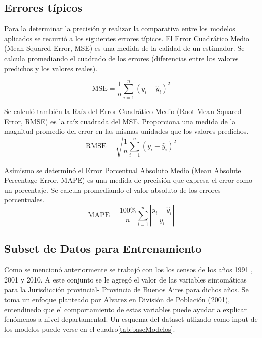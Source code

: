 \documentclass{article}
\theoremstyle{mytheoremstyle}
\theoremstyle{mytheoremstyle}
\theoremstyle{myproblemstyle}
\begin{document}
\subsection{Errores típicos}
 Para la determinar la precisión y realizar la comparativa entre los modelos aplicados se recurrió a los siguientes errores típicos.\newline
El Error Cuadrático Medio (Mean Squared Error, MSE) es una medida de la calidad de un estimador.
Se calcula promediando el cuadrado de los errores (diferencias entre los valores predichos y los valores reales).\newline

  \[
    \text{MSE} = \frac{1}{n} \sum_{i=1}^{n} (y_i - \hat{y}_i)^2
  \]


 Se calculó también la Raíz del Error Cuadrático Medio (Root Mean Squared Error, RMSE) es la raíz cuadrada del MSE. 
Proporciona una medida de la magnitud promedio del error en las mismas unidades que los valores predichos.\newline   
\[
\text{RMSE} = \sqrt{\frac{1}{n} \sum_{i=1}^{n} (y_i - \hat{y}_i)^2}
\]
 
Asimismo se determinó el Error Porcentual Absoluto Medio (Mean Absolute Percentage Error, MAPE) es 
una medida de precisión que expresa el error como un porcentaje. 
Se calcula promediando el valor absoluto de los errores porcentuales.
\[
\text{MAPE} = \frac{100\%}{n} \sum_{i=1}^{n} \left| \frac{y_i - \hat{y}_i}{y_i} \right|
\]

\subsection{Subset de Datos para Entrenamiento}
 Como se mencionó anteriormente se trabajó con los los censos de los años 1991 , 2001 y 2010. A este conjunto se le agregó el valor
 de las variables sintomáticas para la Jurisdicción provincial- Provincia de Buenos Aires para dichos años.
 Se toma un enfoque planteado por Alvarez en División de Población (2001)\cite{alvarez2001},
entendinedo que el  comportamiento de estas variables puede ayudar a explicar fenómenos a nivel departamental.\newline
 Un esquema del dataset utlizado como input de los modelos puede verse en el cuadro\ref{tab:baseModelos}.
\end{document}
